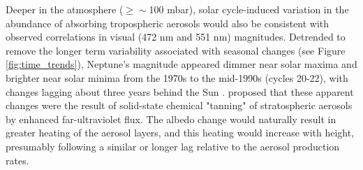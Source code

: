 \documentclass[twocolumn,10pt]{aastex631}
\begin{document}

Deeper in the atmosphere ($\ge\sim$100 mbar), solar cycle-induced variation in the abundance of absorbing tropospheric aerosols would also be consistent with observed correlations in visual (472 nm and 551 nm) magnitudes. Detrended to remove the longer term variability associated with seasonal changes (see Figure \ref{fig:time_trends}), Neptune's magnitude appeared dimmer near solar maxima and brighter near solar minima from the 1970s to the mid-1990s (cycles 20-22), with changes lagging about three years behind the Sun \citep{lockwood2002photometric,lockwood2006photometric,aplin2016determining,lockwood2019final}. \citet{baines_UV_neptune_1990} proposed that these apparent changes were the result of solid-state chemical "tanning" of stratospheric aerosols by enhanced far-ultraviolet flux.  The albedo change would naturally result in greater heating of the aerosol layers, and this heating would increase with height, presumably following a similar or longer lag relative to the aerosol production rates. 
\end{document}
